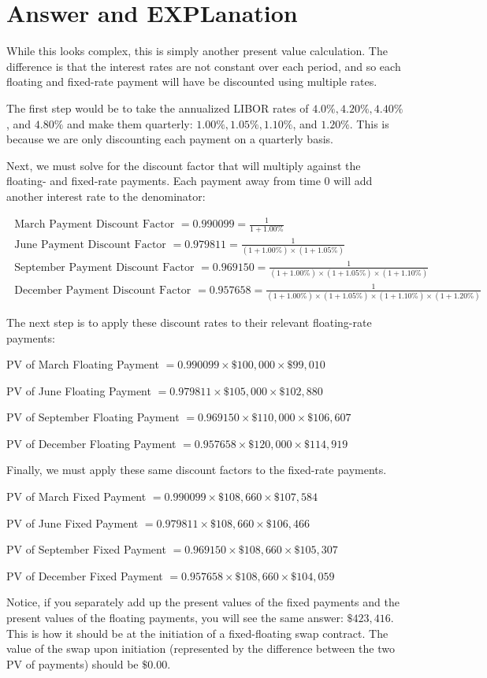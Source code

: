\documentclass[11pt]{article}
\begin{document}
\section*{ Answer and EXPLanation}
While this looks complex, this is simply another present value calculation. The difference is that the interest rates are not constant over each period, and so each floating and fixed-rate payment will have be discounted using multiple rates.

The first step would be to take the annualized LIBOR rates of $4.0 \%, 4.20 \%, 4.40 \%$, and $4.80 \%$ and make them quarterly: $1.00 \%, 1.05 \%, 1.10 \%$, and $1.20 \%$. This is because we are only discounting each payment on a quarterly basis.

Next, we must solve for the discount factor that will multiply against the floating- and fixed-rate payments. Each payment away from time 0 will add another interest rate to the denominator:

$$
\begin{gathered}
\text { March Payment Discount Factor }=0.990099=\frac{1}{1+1.00 \%} \\
\text { June Payment Discount Factor }=0.979811=\frac{1}{(1+1.00 \%) \times(1+1.05 \%)} \\
\text { September Payment Discount Factor }=0.969150=\frac{1}{(1+1.00 \%) \times(1+1.05 \%) \times(1+1.10 \%)} \\
\text { December Payment Discount Factor }=0.957658=\frac{1}{(1+1.00 \%) \times(1+1.05 \%) \times(1+1.10 \%) \times(1+1.20 \%)}
\end{gathered}
$$

The next step is to apply these discount rates to their relevant floating-rate payments:

PV of March Floating Payment $=0.990099 \times \$ 100,000 \times \$ 99,010$

PV of June Floating Payment $=0.979811 \times \$ 105,000 \times \$ 102,880$

PV of September Floating Payment $=0.969150 \times \$ 110,000 \times \$ 106,607$

PV of December Floating Payment $=0.957658 \times \$ 120,000 \times \$ 114,919$

Finally, we must apply these same discount factors to the fixed-rate payments.

PV of March Fixed Payment $=0.990099 \times \$ 108,660 \times \$ 107,584$

PV of June Fixed Payment $=0.979811 \times \$ 108,660 \times \$ 106,466$

PV of September Fixed Payment $=0.969150 \times \$ 108,660 \times \$ 105,307$

PV of December Fixed Payment $=0.957658 \times \$ 108,660 \times \$ 104,059$

Notice, if you separately add up the present values of the fixed payments and the present values of the floating payments, you will see the same answer: $\$ 423,416$. This is how it should be at the initiation of a fixed-floating swap contract. The value of the swap upon initiation (represented by the difference between the two PV of payments) should be $\$ 0.00$.
\end{document}
